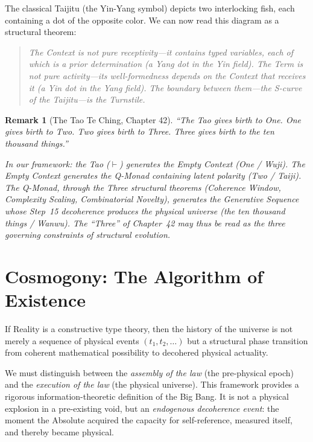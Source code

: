 \documentclass[12pt,a4paper]{article}
\newtheorem{remark}{Remark}[section]
\newcommand{\turnstile}{\vdash}
\begin{document}
The classical Taijitu (the Yin-Yang symbol) depicts two interlocking fish, each containing a dot of the opposite color. We can now read this diagram as a structural theorem:

\begin{quote}
\emph{The Context is not pure receptivity---it contains typed variables, each of which is a prior determination (a Yang dot in the Yin field). The Term is not pure activity---its well-formedness depends on the Context that receives it (a Yin dot in the Yang field). The boundary between them---the S-curve of the Taijitu---is the Turnstile.}
\end{quote}

\begin{remark}[The Tao Te Ching, Chapter 42]
``The Tao gives birth to One. One gives birth to Two. Two gives birth to Three. Three gives birth to the ten thousand things.''

In our framework: the Tao ($\turnstile$) generates the Empty Context (One / Wuji). The Empty Context generates the Q-Monad containing latent polarity (Two / Taiji). The Q-Monad, through the Three structural theorems (Coherence Window, Complexity Scaling, Combinatorial Novelty), generates the Generative Sequence whose Step~15 decoherence produces the physical universe (the ten thousand things / Wanwu). The ``Three'' of Chapter~42 may thus be read as the three governing constraints of structural evolution.
\end{remark}


\section{Cosmogony: The Algorithm of Existence}
\label{sec:cosmogony}

If Reality is a constructive type theory, then the history of the universe is not merely a sequence
of physical events $(t_1, t_2, \ldots)$ but a structural phase transition from coherent mathematical possibility to decohered physical actuality.

We must distinguish between the \emph{assembly of the law} (the pre-physical epoch) and the \emph{execution of the law} (the physical universe). This framework provides a rigorous information-theoretic definition of the Big Bang. It is not a physical explosion in a pre-existing void, but an \emph{endogenous decoherence event}: the moment the Absolute acquired the capacity for self-reference, measured itself, and thereby became physical.
\end{document}
